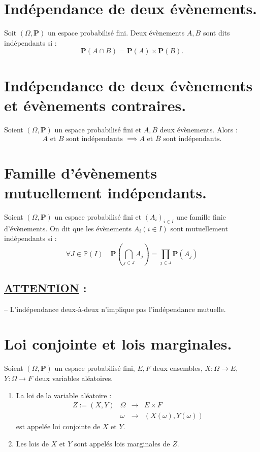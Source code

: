 \documentclass{article}
\begin{document}
\section{Indépendance de deux évènements.} 

Soit $(\Omega, \mathbf{P})$ un espace probabilisé fini. Deux évènements $A, B$ sont dits indépendants si : 
\[
    \mathbf{P}(A \cap B) = \mathbf{P}(A) \times \mathbf{P}(B).
\] 

\section{Indépendance de deux évènements et évènements contraires.}

Soient $(\Omega, \mathbf{P})$ un espace probabilisé fini et $A, B$ deux évènements. Alors : 
\[
    A \text{ et } B \text{ sont indépendants } \implies A \text{ et } \overline{B} \text{ sont indépendants.}
\]

\section{Famille d'évènements mutuellement indépendants.}

Soient $(\Omega, \mathbf{P})$ un espace probabilisé fini et $(A_i)_{i \in I}$ une famille finie d'évènements. On dit que les évènements $A_i (i \in I)$ sont mutuellement indépendants si : 
\[
    \forall J \in \mathbb{P}(I) \quad \mathbf{P}(\bigcap_{j \in J}A_j) = \prod_{j \in J}\mathbf{P}(A_j)
\]

\subsection*{\textbf{\underline{ATTENTION}} :}

\qquad -- L'indépendance deux-à-deux n'implique pas l'indépendance mutuelle. 

\section{Loi conjointe et lois marginales.} 

Soient $(\Omega, \mathbf{P})$ un espace probabilisé fini, $E, F$ deux ensembles, $X : \Omega \longrightarrow E$, $Y : \Omega \longrightarrow F$ deux variables aléatoires.

\begin{enumerate}[label=(\alph*)]
    \item La loi de la variable aléatoire : 
    \[
        \begin{array}{c|ccc}
            Z := (X, Y) & \Omega & \longrightarrow & E \times F
            \\[0.3em]
                        & \omega & \longrightarrow & (X(\omega), Y(\omega))
        \end{array}
    \]
est appelée loi conjointe de $X$ et $Y$.
    \item Les lois de $X$ et $Y$ sont appelés lois marginales de $Z$. 
\end{enumerate}
\end{document}
